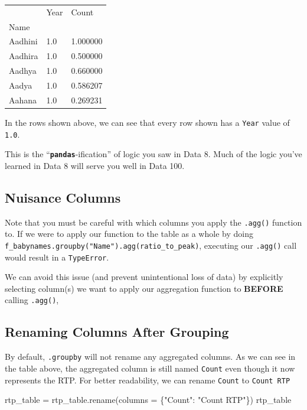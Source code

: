 \documentclass[
  letterpaper,
  DIV=11,
  numbers=noendperiod]{scrreprt}
\newenvironment{Shaded}{\begin{snugshade}}{\end{snugshade}}
\newcommand{\NormalTok}[1]{\textcolor[rgb]{0.00,0.23,0.31}{#1}}
\newcommand{\OperatorTok}[1]{\textcolor[rgb]{0.37,0.37,0.37}{#1}}
\newcommand{\StringTok}[1]{\textcolor[rgb]{0.13,0.47,0.30}{#1}}
\begin{document}
\begin{longtable}[]{@{}lll@{}}
\toprule\noalign{}
& Year & Count \\
Name & & \\
\midrule\noalign{}
\endhead
\bottomrule\noalign{}
\endlastfoot
Aadhini & 1.0 & 1.000000 \\
Aadhira & 1.0 & 0.500000 \\
Aadhya & 1.0 & 0.660000 \\
Aadya & 1.0 & 0.586207 \\
Aahana & 1.0 & 0.269231 \\
\end{longtable}

In the rows shown above, we can see that every row shown has a
\texttt{Year} value of \texttt{1.0}.

This is the ``\textbf{\texttt{pandas}}-ification'' of logic you saw in
Data 8. Much of the logic you've learned in Data 8 will serve you well
in Data 100.

\subsection{Nuisance Columns}\label{nuisance-columns}

Note that you must be careful with which columns you apply the
\texttt{.agg()} function to. If we were to apply our function to the
table as a whole by doing
\texttt{f\_babynames.groupby("Name").agg(ratio\_to\_peak)}, executing
our \texttt{.agg()} call would result in a \texttt{TypeError}.

We can avoid this issue (and prevent unintentional loss of data) by
explicitly selecting column(s) we want to apply our aggregation function
to \textbf{BEFORE} calling \texttt{.agg()},

\subsection{Renaming Columns After
Grouping}\label{renaming-columns-after-grouping}

By default, \texttt{.groupby} will not rename any aggregated columns. As
we can see in the table above, the aggregated column is still named
\texttt{Count} even though it now represents the RTP. For better
readability, we can rename \texttt{Count} to \texttt{Count\ RTP}

\begin{Shaded}
\begin{Highlighting}[]
\NormalTok{rtp\_table }\OperatorTok{=}\NormalTok{ rtp\_table.rename(columns }\OperatorTok{=}\NormalTok{ \{}\StringTok{"Count"}\NormalTok{: }\StringTok{"Count RTP"}\NormalTok{\})}
\NormalTok{rtp\_table}
\end{Highlighting}
\end{Shaded}
\end{document}
